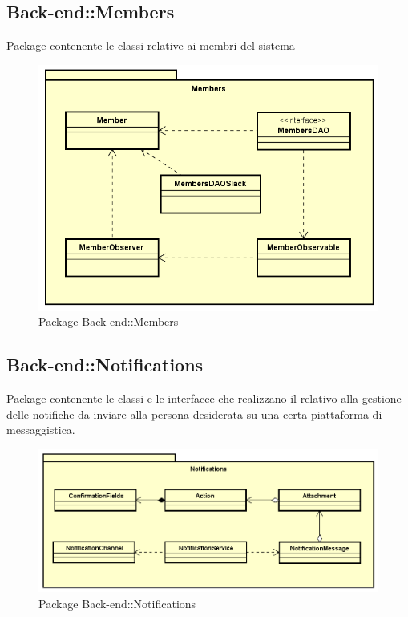 \subsection{Back-end::Members}
Package contenente le classi relative ai membri del sistema
\begin{figure}[h] \centering \includegraphics[width=\textwidth,height=\textheight,keepaspectratio]{images/diagrams/back-end/Official_Backend_0304/Member.png}
\caption{Package Back-end::Members}
\end{figure}
\newpage

\subsection{Back-end::Notifications}
Package contenente le classi e le interfacce che realizzano il  relativo alla gestione delle notifiche da inviare alla persona desiderata su una certa piattaforma di messaggistica.
\begin{figure}[h] \centering \includegraphics[width=\textwidth,height=\textheight,keepaspectratio]{images/diagrams/back-end/Official_Backend_0304/Notifications.png}
\caption{Package Back-end::Notifications}
\end{figure}
\newpage

